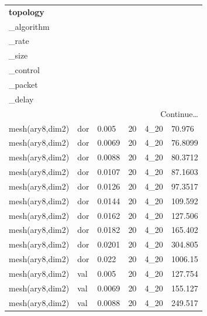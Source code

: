 \begin{longtable}[H]{llllll}
\textbf{topology} &
  \textbf{\begin{tabular}[c]{@{}l@{}}routing\\ \_algorithm\end{tabular}} &
  \textbf{\begin{tabular}[c]{@{}l@{}}injection\\ \_rate\end{tabular}} &
  \textbf{\begin{tabular}[c]{@{}l@{}}packet\\ \_size\end{tabular}} &
  \textbf{\begin{tabular}[c]{@{}l@{}}flow\\ \_control\end{tabular}} &
  \textbf{\begin{tabular}[c]{@{}l@{}}average\\ \_packet\\ \_delay\end{tabular}} \\ \hline
\endhead %
\hline
\multicolumn{6}{r}{Continue…}\\
\endfoot %
\hline
\endlastfoot%
mesh(ary8,dim2) & dor        & 0.005  & 20 & 4\_20 & 70.976  \\
mesh(ary8,dim2) & dor        & 0.0069 & 20 & 4\_20 & 76.8099 \\
mesh(ary8,dim2) & dor        & 0.0088 & 20 & 4\_20 & 80.3712 \\
mesh(ary8,dim2) & dor        & 0.0107 & 20 & 4\_20 & 87.1603 \\
mesh(ary8,dim2) & dor        & 0.0126 & 20 & 4\_20 & 97.3517 \\
mesh(ary8,dim2) & dor        & 0.0144 & 20 & 4\_20 & 109.592 \\
mesh(ary8,dim2) & dor        & 0.0162 & 20 & 4\_20 & 127.506 \\
mesh(ary8,dim2) & dor        & 0.0182 & 20 & 4\_20 & 165.402 \\
mesh(ary8,dim2) & dor        & 0.0201 & 20 & 4\_20 & 304.805 \\
mesh(ary8,dim2) & dor        & 0.022  & 20 & 4\_20 & 1006.15 \\ \hline
mesh(ary8,dim2) & val        & 0.005  & 20 & 4\_20 & 127.754 \\
mesh(ary8,dim2) & val        & 0.0069 & 20 & 4\_20 & 155.127 \\
mesh(ary8,dim2) & val        & 0.0088 & 20 & 4\_20 & 249.517 \\

\end{longtable}
